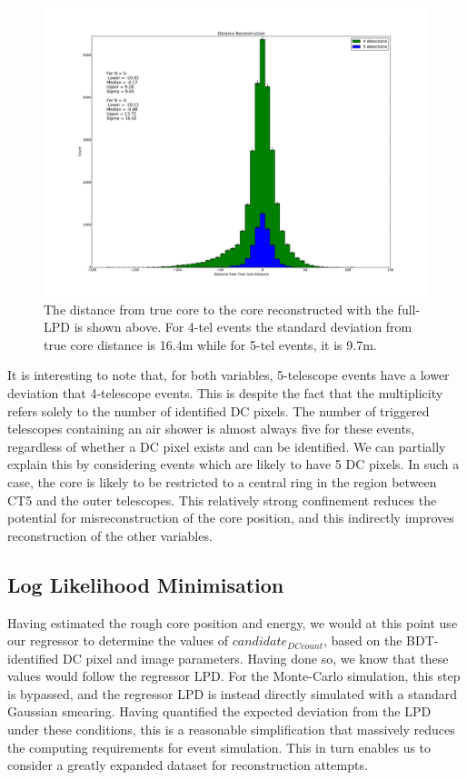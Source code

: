 \documentclass[11pt]{article}
\begin{document}
\begin{figure}
\begin{center}
\includegraphics[width=\textwidth]{rawcoredistance}
\caption{The distance from true core to the core reconstructed with the full-LPD is shown above. For 4-tel events the standard deviation from true core distance is 16.4m while for 5-tel events, it is 9.7m.}
\label{fig:rawcoredistance}
\end{center}
\end{figure} 

It is interesting to note that, for both variables, 5-telescope events have a lower deviation that 4-telescope events. This is despite the fact that the multiplicity refers solely to the number of identified DC pixels. The number of triggered telescopes containing an air shower is almost always five for these events, regardless of whether a DC pixel exists and can be identified. We can partially explain this by considering events which are likely to have 5 DC pixels. In such a case, the core is likely to be restricted to a central ring in the region between CT5 and the outer telescopes. This relatively strong confinement reduces the potential for misreconstruction of the core position, and this indirectly improves reconstruction of the other variables.

\subsection{Log Likelihood Minimisation}
Having estimated the rough core position and energy, we would at this point use our regressor to determine the values of $candidate_{DCcount}$, based on the BDT-identified DC pixel and image parameters. Having done so, we know that these values would follow the regressor LPD. For the Monte-Carlo simulation, this step is bypassed, and the regressor LPD is instead directly simulated with a standard Gaussian smearing. Having quantified the expected deviation from the LPD under these conditions, this is a reasonable simplification that massively reduces the computing requirements for event simulation. This in turn enables us to consider a greatly expanded dataset for reconstruction attempts.
 
\end{document}
